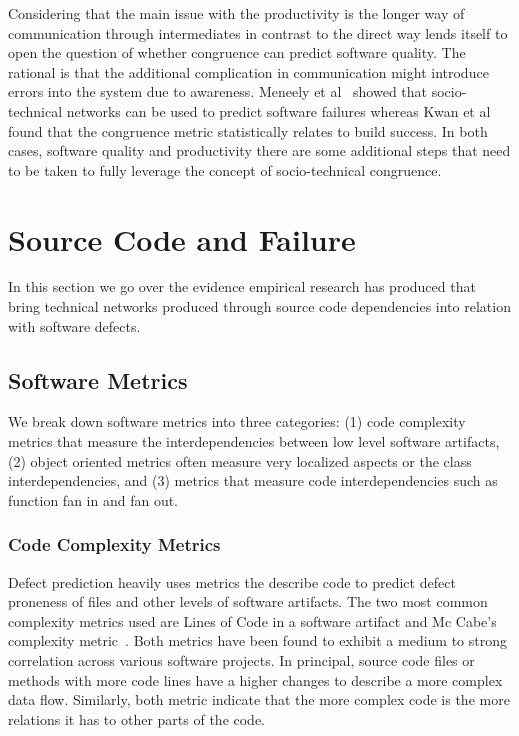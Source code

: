 Considering that the main issue with the productivity is the longer way of communication through intermediates in contrast to the direct way lends itself to open the question of whether congruence can predict software quality.
The rational is that the additional complication in communication might introduce errors into the system due to awareness.
Meneely et al~\cite{meneely:fse:2008} showed that socio-technical networks can be used to predict software failures whereas Kwan et al~\cite{kwan:tse:2011} found that the congruence metric statistically relates to build success.
In both cases, software quality and productivity there are some additional steps that need to be taken to fully leverage the concept of socio-technical congruence.



\section{Source Code and Failure}
In this section we go over the evidence empirical research has produced that bring technical networks produced through source code dependencies into relation with software defects.

\subsection{Software Metrics}
\label{chap:6:measure}
We break down software metrics into three categories:
(1) code complexity metrics that measure the interdependencies between low level software artifacts,
(2) object oriented metrics often measure very localized aspects or the class interdependencies,
and (3) metrics that measure code interdependencies such as function fan in and fan out.

\subsubsection{Code Complexity Metrics}
Defect prediction heavily uses metrics the describe code to predict defect proneness of files and other levels of software artifacts.
%
The two most common complexity metrics used are Lines of Code in a software artifact and Mc Cabe's complexity metric~\cite{mccabe:ieee:1976}.
Both metrics have been found to exhibit a medium to strong correlation across various software projects.
In principal, source code files or methods with more code lines have a higher changes to describe a more complex data flow.
Similarly, both metric indicate that the more complex code is the more relations it has to other parts of the code.

